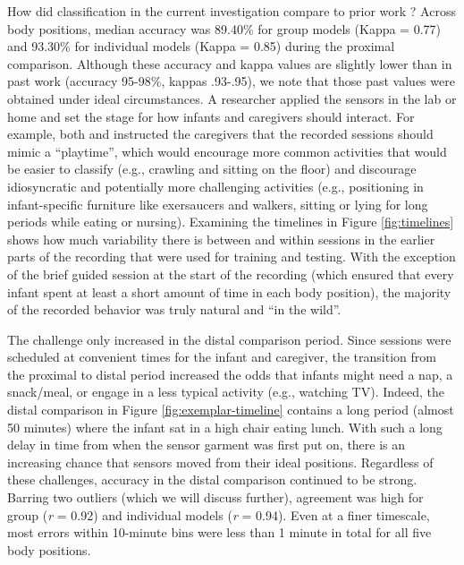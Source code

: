 \documentclass[
  man]{apa6}
\begin{document}
How did classification in the current investigation compare to prior work \autocite{FranchakScott2021,AiraksinenRasanen2020,AiraksinenGallen2022}? Across body positions, median accuracy was 89.40\% for group models (Kappa = 0.77) and 93.30\% for individual models (Kappa = 0.85) during the proximal comparison. Although these accuracy and kappa values are slightly lower than in past work (accuracy 95-98\%, kappas .93-.95), we note that those past values were obtained under ideal circumstances. A researcher applied the sensors in the lab \autocite{FranchakScott2021,AiraksinenRasanen2020} or home \autocite{AiraksinenGallen2022} and set the stage for how infants and caregivers should interact. For example, both \textcite{FranchakScott2021} and \textcite{AiraksinenGallen2022} instructed the caregivers that the recorded sessions should mimic a ``playtime'', which would encourage more common activities that would be easier to classify (e.g., crawling and sitting on the floor) and discourage idiosyncratic and potentially more challenging activities (e.g., positioning in infant-specific furniture like exersaucers and walkers, sitting or lying for long periods while eating or nursing). Examining the timelines in Figure \ref{fig:timelines} shows how much variability there is between and within sessions in the earlier parts of the recording that were used for training and testing. With the exception of the brief guided session at the start of the recording (which ensured that every infant spent at least a short amount of time in each body position), the majority of the recorded behavior was truly natural and ``in the wild''.

The challenge only increased in the distal comparison period. Since sessions were scheduled at convenient times for the infant and caregiver, the transition from the proximal to distal period increased the odds that infants might need a nap, a snack/meal, or engage in a less typical activity (e.g., watching TV). Indeed, the distal comparison in Figure \ref{fig:exemplar-timeline} contains a long period (almost 50 minutes) where the infant sat in a high chair eating lunch. With such a long delay in time from when the sensor garment was first put on, there is an increasing chance that sensors moved from their ideal positions. Regardless of these challenges, accuracy in the distal comparison continued to be strong. Barring two outliers (which we will discuss further), agreement was high for group (\emph{r} = 0.92) and individual models (\emph{r} = 0.94). Even at a finer timescale, most errors within 10-minute bins were less than 1 minute in total for all five body positions.
\end{document}
